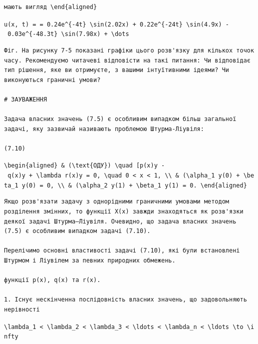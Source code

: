 \documentclass[
  ukrainian,
]{article}
\begin{document}
\begin{verbatim}
мають вигляд \end{aligned}
\end{verbatim}

\texttt{u(x,\ t)\ =\ =\ 0.24e\^{}\{-4t\}\ \textbackslash{}sin(2.02x)\ +\ 0.22e\^{}\{-24t\}\ \textbackslash{}sin(4.9x)\ -\ 0.03e\^{}\{-48.3t\}\ \textbackslash{}sin(7.98x)\ +\ \textbackslash{}dots}

\begin{verbatim}
Фіг. На рисунку 7-5 показані графіки цього розв'язку для кількох точок часу. Рекомендуємо читачеві відповісти на такі питання: Чи відповідає тип рішення, яке ви отримуєте, з вашими інтуїтивними ідеями? Чи виконуються граничні умови?

# ЗАУВАЖЕННЯ

Задача власних значень (7.5) є особливим випадком більш загальної задачі, яку зазвичай називають проблемою Штурма-Ліувіля:

(7.10)
\end{verbatim}

\texttt{\textbackslash{}begin\{aligned\}\ \&\ (\textbackslash{}text\{ОДУ\})\ \textbackslash{}quad\ {[}p(x)y\textquotesingle{}{]}\textquotesingle{}\ -\ q(x)y\ +\ \textbackslash{}lambda\ r(x)y\ =\ 0,\ \textbackslash{}quad\ 0\ \textless{}\ x\ \textless{}\ 1,\ \textbackslash{}\textbackslash{}\ \&\ (\textbackslash{}alpha\_1\ y(0)\ +\ \textbackslash{}beta\_1\ y\textquotesingle{}(0)\ =\ 0,\ \textbackslash{}\textbackslash{}\ \&\ (\textbackslash{}alpha\_2\ y(1)\ +\ \textbackslash{}beta\_1\ y\textquotesingle{}(1)\ =\ 0.\ \textbackslash{}end\{aligned\}}

\begin{verbatim}
Якщо розв'язати задачу з однорідними граничними умовами методом розділення змінних, то функції X(x) завжди знаходяться як розв'язки деякої задачі Штурма–Ліувіля. Очевидно, що задача власних значень (7.5) є особливим випадком задачі (7.10).

Перелічимо основні властивості задачі (7.10), які були встановлені Штурмом і Ліувілем за певних природних обмежень.

функції p(x), q(x) та r(x).

1. Існує нескінченна послідовність власних значень, що задовольняють нерівності
\end{verbatim}

\texttt{\textbackslash{}lambda\_1\ \textless{}\ \textbackslash{}lambda\_2\ \textless{}\ \textbackslash{}lambda\_3\ \textless{}\ \textbackslash{}ldots\ \textless{}\ \textbackslash{}lambda\_n\ \textless{}\ \textbackslash{}ldots\ \textbackslash{}to\ \textbackslash{}infty}
\end{document}

